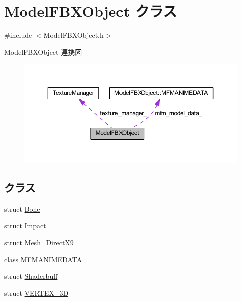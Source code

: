 \hypertarget{class_model_f_b_x_object}{}\section{Model\+F\+B\+X\+Object クラス}
\label{class_model_f_b_x_object}


{\ttfamily \#include $<$Model\+F\+B\+X\+Object.\+h$>$}



Model\+F\+B\+X\+Object 連携図\nopagebreak
\begin{figure}[H]
\begin{center}
\leavevmode
\includegraphics[width=350pt]{class_model_f_b_x_object__coll__graph}
\end{center}
\end{figure}
\subsection*{クラス}
\begin{DoxyCompactItemize}
\item 
struct \mbox{\hyperlink{struct_model_f_b_x_object_1_1_bone}{Bone}}
\item 
struct \mbox{\hyperlink{struct_model_f_b_x_object_1_1_impact}{Impact}}
\item 
struct \mbox{\hyperlink{struct_model_f_b_x_object_1_1_mesh___direct_x9}{Mesh\+\_\+\+Direct\+X9}}
\item 
class \mbox{\hyperlink{class_model_f_b_x_object_1_1_m_f_m_a_n_i_m_e_d_a_t_a}{M\+F\+M\+A\+N\+I\+M\+E\+D\+A\+TA}}
\item 
struct \mbox{\hyperlink{struct_model_f_b_x_object_1_1_shaderbuff}{Shaderbuff}}
\item 
struct \mbox{\hyperlink{struct_model_f_b_x_object_1_1_v_e_r_t_e_x__3_d}{V\+E\+R\+T\+E\+X\+\_\+3D}}
\end{DoxyCompactItemize}
